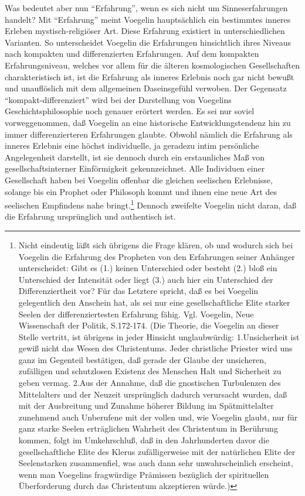 Was bedeutet aber nun "`Erfahrung"', wenn es sich nicht um
Sinneserfahrungen handelt? Mit "`Erfahrung"' meint Voegelin
hauptsächlich ein bestimmtes inneres Erleben mystisch-religiöser Art.
Diese Erfahrung existiert in unterschiedlichen Varianten. So
unterscheidet Voegelin die Erfahrungen hinsichtlich ihres Niveaus nach
kompakten und differenzierten Erfahrungen. Auf dem kompakten
Erfahrungsniveau, welches vor allem für die älteren kosmologischen
Gesellschaften charakteristisch ist, ist die Erfahrung als inneres
Erlebnis noch gar nicht bewußt und unauflöslich mit dem allgemeinen
Daseinsgefühl verwoben. Der Gegensatz "`kompakt-differenziert"' wird bei
der Darstellung von Voegelins Geschichtsphilosophie noch genauer
erörtert werden. Es sei nur soviel vorweggenommen, daß Voegelin an eine
historische Entwicklungstendenz hin zu immer differenzierteren
Erfahrungen glaubte. Obwohl nämlich die Erfahrung als inneres Erlebnis
eine höchst individuelle, ja geradezu intim persönliche Angelegenheit
darstellt, ist sie dennoch durch ein erstaunliches Maß von
gesellschaftsinterner Einförmigkeit gekennzeichnet. Alle Individuen
einer Gesellschaft haben bei Voegelin offenbar die gleichen seelischen
Erlebnisse, solange bis ein Prophet oder Philosoph kommt und ihnen eine
neue Art des seelischen Empfindens nahe bringt.\footnote{Nicht eindeutig
  läßt sich übrigens die Frage klären, ob und wodurch sich bei Voegelin
  die Erfahrung des Propheten von den Erfahrungen seiner Anhänger
  unterscheidet: Gibt es (1.) keinen Unterschied oder besteht (2.) bloß
  ein Unterschied der Intensität oder liegt (3.) auch hier ein
  Unterschied der Differenziertheit vor? Für das Letztere spricht, daß
  es bei Voegelin gelegentlich den Anschein hat, als sei nur eine
  gesellschaftliche Elite starker Seelen der differenziertesten
  Erfahrung fähig. Vgl. Voegelin, Neue Wissenschaft der Politik,
  S.172-174. (Die Theorie, die Voegelin an dieser Stelle vertritt, ist
  übrigens in jeder Hinsicht unglaubwürdig: 1.Unsicherheit ist gewiß
  nicht das Wesen des Christentums. Jeder christliche Priester wird uns
  ganz im Gegenteil bestätigen, daß gerade der Glaube der unsicheren,
  zufälligen und schutzlosen Existenz des Menschen Halt und Sicherheit
  zu geben vermag. 2.Aus der Annahme, daß die gnostischen Turbulenzen
  des Mittelalters und der Neuzeit ursprünglich dadurch verursacht
  wurden, daß mit der Ausbreitung und Zunahme höherer Bildung im
  Spätmittelalter zunehmend auch Unberufene mit der vollen und, wie
  Voegelin glaubt, nur für ganz starke Seelen erträglichen Wahrheit des
  Christentum in Berührung kommen, folgt im Umkehrschluß, daß in den
  Jahrhunderten davor die gesellschaftliche Elite des Klerus
  zufälligerweise mit der natürlichen Elite der Seelenstarken
  zusammenfiel, was auch dann sehr unwahrscheinlich erscheint, wenn man
  Voegelins fragwürdige Prämissen bezüglich der spirituellen
  Überforderung durch das Christentum akzeptieren würde.)} Dennoch
zweifelte Voegelin nicht daran, daß die Erfahrung ursprünglich und
authentisch ist.

